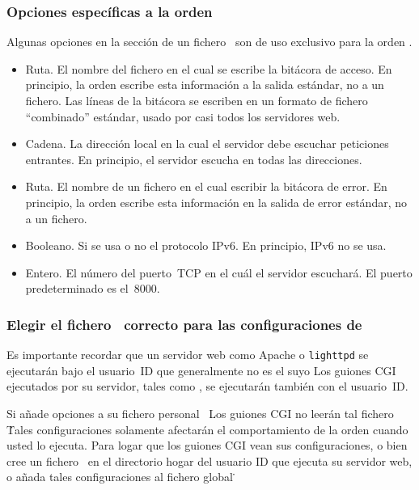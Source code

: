 \subsubsection{Opciones específicas a la orden }

Algunas opciones en la sección  de un fichero \hgrc\
son de uso exclusivo para la orden .
\begin{itemize}
\item[\rcitem{web}{accesslog}] Ruta.  El nombre del fichero en el cual
  se escribe la bitácora de acceso.  En principio, la orden
   escribe esta información a la salida estándar, no a un
  fichero. Las líneas de la bitácora se escriben en un formato de
  fichero ``combinado'' estándar, usado por casi todos los servidores
  web.
\item[\rcitem{web}{address}] Cadena.  La dirección local en la cual el
  servidor debe escuchar peticiones entrantes.  En principio, el
  servidor escucha en todas las direcciones.
\item[\rcitem{web}{errorlog}] Ruta.  El nombre de un fichero en el
  cual escribir la bitácora de error.  En principio, la orden
   escribe esta información en la salida de error
  estándar, no a un fichero.
\item[\rcitem{web}{ipv6}] Booleano.  Si se usa o no el protocolo
  IPv6. En principio, IPv6 no se usa.
\item[\rcitem{web}{port}] Entero.  El número del puerto~TCP en el cuál
  el servidor escuchará.  El puerto predeterminado es el~8000.
\end{itemize}

\subsubsection{Elegir el fichero \hgrc\ correcto para las
  configuraciones de }

Es importante recordar que un servidor web como Apache o
\texttt{lighttpd} se ejecutarán bajo el usuario~ID que generalmente no
es el suyo  Los guiones CGI ejecutados por su servidor, tales como
\sfilename{hgweb.cgi}, se ejecutarán también con el usuario~ID.

Si añade opciones  a su fichero personal \hgrc\, Los
guiones CGI no leerán tal fichero \hgrc\.  Tales configuraciones
solamente afectarán el comportamiento de la orden \hgcmd{serve} cuando
usted lo ejecuta.  Para logar que los guiones CGI vean sus
configuraciones, o bien cree un fichero \hgrc\ en el directorio hogar
del usuario ID que ejecuta su servidor web, o añada tales
configuraciones al fichero global \hgrc\.


